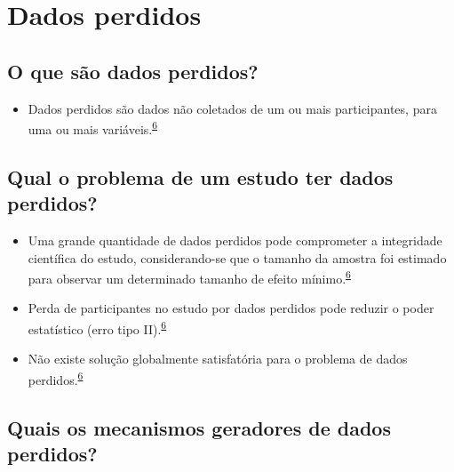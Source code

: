 \documentclass[
]{book}
\providecommand{\tightlist}{%
  \setlength{\itemsep}{0pt}\setlength{\parskip}{0pt}}
\begin{document}
\hypertarget{dados-perdidos}{%
\section{Dados perdidos}\label{dados-perdidos}}

\hypertarget{o-que-suxe3o-dados-perdidos}{%
\subsection{O que são dados perdidos?}\label{o-que-suxe3o-dados-perdidos}}

\begin{itemize}
\tightlist
\item
  Dados perdidos são dados não coletados de um ou mais participantes, para uma ou mais variáveis.\textsuperscript{\protect\hyperlink{ref-Altman2007}{6}}
\end{itemize}

\hypertarget{qual-o-problema-de-um-estudo-ter-dados-perdidos}{%
\subsection{Qual o problema de um estudo ter dados perdidos?}\label{qual-o-problema-de-um-estudo-ter-dados-perdidos}}

\begin{itemize}
\item
  Uma grande quantidade de dados perdidos pode comprometer a integridade científica do estudo, considerando-se que o tamanho da amostra foi estimado para observar um determinado tamanho de efeito mínimo.\textsuperscript{\protect\hyperlink{ref-Altman2007}{6}}
\item
  Perda de participantes no estudo por dados perdidos pode reduzir o poder estatístico (erro tipo II).\textsuperscript{\protect\hyperlink{ref-Altman2007}{6}}
\item
  Não existe solução globalmente satisfatória para o problema de dados perdidos.\textsuperscript{\protect\hyperlink{ref-Altman2007}{6}}
\end{itemize}

\hypertarget{quais-os-mecanismos-geradores-de-dados-perdidos}{%
\subsection{Quais os mecanismos geradores de dados perdidos?}\label{quais-os-mecanismos-geradores-de-dados-perdidos}}
\end{document}
